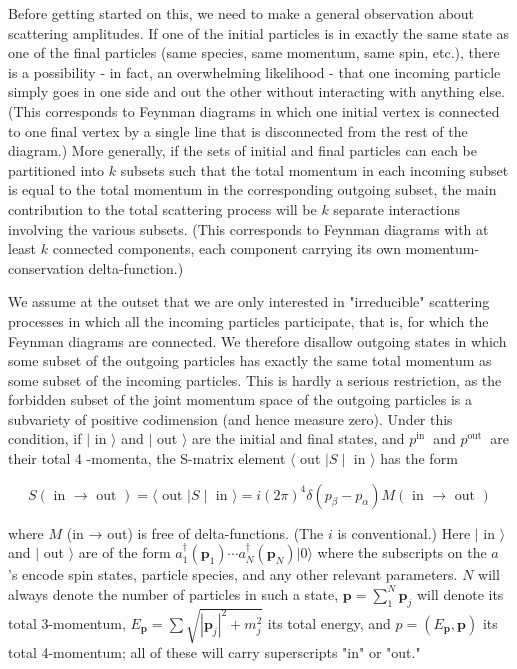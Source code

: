 \documentclass[10pt, letterpaper]{article}
\begin{document}
Before getting started on this, we need to make a general observation about scattering amplitudes. If one of the initial particles is in exactly the same state as\\
one of the final particles (same species, same momentum, same spin, etc.), there is a possibility - in fact, an overwhelming likelihood - that one incoming particle simply goes in one side and out the other without interacting with anything else. (This corresponds to Feynman diagrams in which one initial vertex is connected to one final vertex by a single line that is disconnected from the rest of the diagram.) More generally, if the sets of initial and final particles can each be partitioned into $k$ subsets such that the total momentum in each incoming subset is equal to the total momentum in the corresponding outgoing subset, the main contribution to the total scattering process will be $k$ separate interactions involving the various subsets. (This corresponds to Feynman diagrams with at least $k$ connected components, each component carrying its own momentum-conservation delta-function.)

We assume at the outset that we are only interested in "irreducible" scattering processes in which all the incoming particles participate, that is, for which the Feynman diagrams are connected. We therefore disallow outgoing states in which some subset of the outgoing particles has exactly the same total momentum as some subset of the incoming particles. This is hardly a serious restriction, as the forbidden subset of the joint momentum space of the outgoing particles is a subvariety of positive codimension (and hence measure zero). Under this condition, if $\mid$ in $\rangle$ and $\mid$ out $\rangle$ are the initial and final states, and $p^{\text {in }}$ and $p^{\text {out }}$ are their total 4 -momenta, the S-matrix element $\langle$ out $| S \mid$ in $\rangle$ has the form

$$
S(\text { in } \rightarrow \text { out })=\langle\text { out }| S \mid \text { in }\rangle=i(2 \pi)^{4} \delta\left(p_{\beta}-p_{\alpha}\right) M(\text { in } \rightarrow \text { out })
$$

where $M$ (in → out) is free of delta-functions. (The $i$ is conventional.) Here $\mid$ in $\rangle$ and $\mid$ out $\rangle$ are of the form $a_{1}^{\dagger}\left(\mathbf{p}_{1}\right) \cdots a_{N}^{\dagger}\left(\mathbf{p}_{N}\right)|0\rangle$ where the subscripts on the $a$ 's encode spin states, particle species, and any other relevant parameters. $N$ will always denote the number of particles in such a state, $\mathbf{p}=\sum_{1}^{N} \mathbf{p}_{j}$ will denote its total 3-momentum, $E_{\mathbf{p}}=\sum \sqrt{\left|\mathbf{p}_{j}\right|^{2}+m_{j}^{2}}$ its total energy, and $p=\left(E_{\mathbf{p}}, \mathbf{p}\right)$ its total 4-momentum; all of these will carry superscripts "in" or "out."
\end{document}
